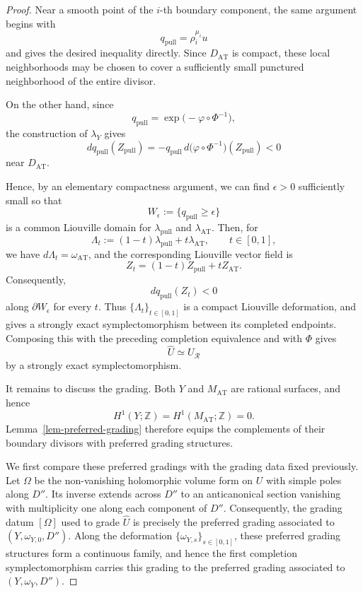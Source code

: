\documentclass[11pt, reqno]{amsart}
\theoremstyle{definition}
\begin{document}
\begin{proof}
Near a smooth point of the $i$-th boundary component, the same
argument begins with
\[
q_{\mathrm{pull}}=\rho_i^{\mu_i}u
\]
and gives the desired inequality directly. Since
$D_{\mathrm{AT}}$ is compact, these local neighborhoods may be chosen
to cover a sufficiently small punctured neighborhood of the entire
divisor.


On the other hand, since
\[
q_{\mathrm{pull}}
=
\exp\bigl(-\varphi\circ\Phi^{-1}\bigr),
\]
the construction of $\lambda_Y$ gives
\[
dq_{\mathrm{pull}}(Z_{\mathrm{pull}})
=
-q_{\mathrm{pull}}\,
d\bigl(\varphi\circ\Phi^{-1}\bigr)(Z_{\mathrm{pull}})
<0
\]
near $D_{\mathrm{AT}}$.

Hence, by an elementary compactness argument, we can find $\epsilon>0$ sufficiently small so that
\[
W_\epsilon:=\{q_{\mathrm{pull}}\geq\epsilon\}
\] is a common Liouville domain for $\lambda_{\mathrm{pull}}$ and
$\lambda_{\mathrm{AT}}$. Then, for
\[
\Lambda_t
:=(1-t)\lambda_{\mathrm{pull}}+t\lambda_{\mathrm{AT}},
\qquad t\in[0,1],
\]
we have $d\Lambda_t=\omega_{\mathrm{AT}}$, and the corresponding
Liouville vector field is
\[
Z_t=(1-t)Z_{\mathrm{pull}}+tZ_{\mathrm{AT}}.
\]
Consequently,
\[
dq_{\mathrm{pull}}(Z_t)<0
\]
along $\partial W_\epsilon$ for every $t$. Thus
$\{\Lambda_t\}_{t\in[0,1]}$ is a compact Liouville deformation, and
\cite[Proposition~11.8]{CE} gives a strongly exact symplectomorphism
between its completed endpoints. Composing this with the preceding
completion equivalence and with $\Phi$ gives
\[
\widehat U\simeq U_{\mathcal R}
\]
by a strongly exact symplectomorphism.





It remains to discuss the grading. Both $Y$ and $M_{\mathrm{AT}}$
are rational surfaces, and hence
\[
H^1(Y;\mathbb Z)=H^1(M_{\mathrm{AT}};\mathbb Z)=0.
\]
Lemma~\ref{lem-preferred-grading} therefore equips the complements of their boundary divisors
with preferred grading structures.

We first compare these preferred gradings with the grading data fixed
previously. Let $\Omega$ be the non-vanishing holomorphic volume form
on $U$ with simple poles along $D''$. Its inverse extends across $D''$
to an anticanonical section vanishing with multiplicity one along each
component of $D''$. Consequently, the grading datum $[\Omega]$ used
to grade $\widehat U$ is precisely the preferred grading associated
to $(Y,\omega_{Y,0},D'')$. Along the deformation
$\{\omega_{Y,s}\}_{s\in[0,1]}$, these preferred grading structures
form a continuous family, and hence the first completion
symplectomorphism carries this grading to the preferred grading
associated to $(Y,\omega_Y,D'')$.


\end{proof}
\end{document}
